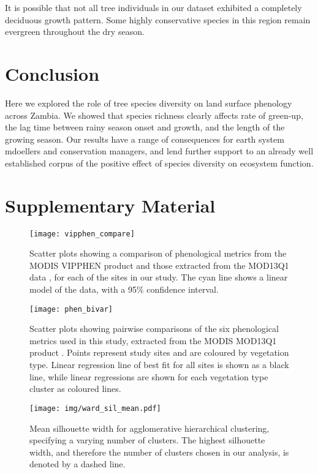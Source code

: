 \documentclass[11pt,a4paper]{article}
\newcommand{\beginsupplement}{%
	\setcounter{table}{0}
	\renewcommand{\thetable}{S\arabic{table}}%
	\setcounter{figure}{0}
	\renewcommand{\thefigure}{S\arabic{figure}}%
	}
\begin{document}
It is possible that not all tree individuals in our dataset exhibited a completely deciduous growth pattern. Some highly conservative species in this region remain evergreen throughout the dry season.

\section{Conclusion}

Here we explored the role of tree species diversity on land surface phenology across Zambia. We showed that species richness clearly affects rate of green-up, the lag time between rainy season onset and growth, and the length of the growing season. Our results have a range of consequences for earth system mdoellers and conservation managers, and lend further support to an already well established corpus of the positive effect of species diversity on ecosystem function.

\printbibliography

\section{Supplementary Material}
\beginsupplement

\begin{figure}[H]
\centering
	\texttt{[image: vipphen\_compare]}
	\caption{Scatter plots showing a comparison of phenological metrics from the MODIS VIPPHEN product \citep{VIPPHEN} and those extracted from the MOD13Q1 data \citep{MOD13Q1}, for each of the sites in our study. The cyan line shows a linear model of the data, with a 95\% confidence interval.}
	\label{vipphen_compare}
\end{figure}



\begin{figure}[H]
\centering
	\texttt{[image: phen\_bivar]}
	\caption{Scatter plots showing pairwise comparisons of the six phenological metrics used in this study, extracted from the MODIS MOD13Q1 product \citep{MOD13Q1}. Points represent study sites and are coloured by vegetation type. Linear regression line of best fit for all sites is shown as a black line, while linear regressions are shown for each vegetation type cluster as coloured lines.}
	\label{phen_bivar}
\end{figure}



\begin{figure}[H]
\centering
	\texttt{[image: img/ward\_sil\_mean.pdf]}
	\caption{Mean silhouette width for agglomerative hierarchical clustering, specifying a varying number of clusters. The highest silhouette width, and therefore the number of clusters chosen in our analysis, is denoted by a dashed line.}
	\label{ward_sil}
\end{figure}


\end{document}
